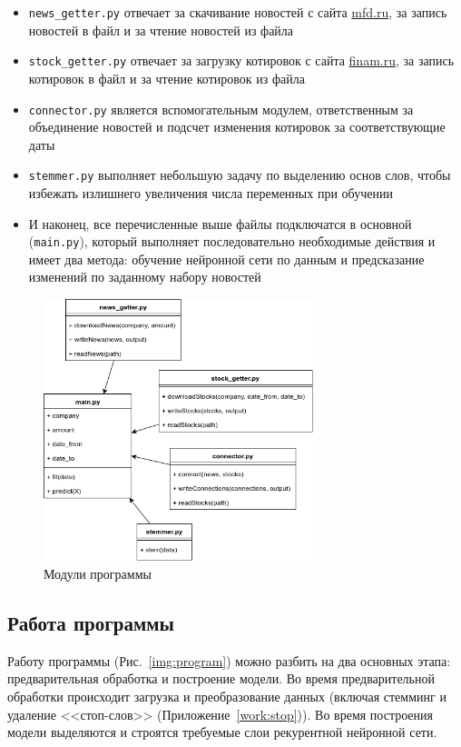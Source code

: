 \documentclass[14pt]{matmex-diploma-custom}
\begin{document}
\begin{itemize}
\item \texttt{news\_getter.py} отвечает за скачивание новостей с сайта \url{mfd.ru}, за запись новостей в файл и за чтение новостей из файла
\item \texttt{stock\_getter.py} отвечает за загрузку котировок с сайта \url{finam.ru}, за запись котировок в файл и за чтение котировок из файла
\item \texttt{connector.py} является вспомогательным модулем, ответственным за объединение новостей и подсчет изменения котировок за соответствующие даты
\item \texttt{stemmer.py} выполняет небольшую задачу по выделению основ слов, чтобы избежать излишнего увеличения числа переменных при обучении
\item И наконец, все перечисленные выше файлы подключатся в основной (\texttt{main.py}), который выполняет последовательно необходимые действия и имеет два метода: обучение нейронной сети по данным и предсказание изменений по заданному набору новостей
\end{itemize}

\begin{figure}[h]
\centering
\includegraphics[width=0.7\textwidth]{img/class}
\caption{Модули программы}
\label{img:class}
\end{figure}

\subsection{Работа программы}

Работу программы (Рис.~\ref{img:program}) можно разбить на два основных этапа: предварительная обработка и построение модели. Во время предварительной обработки происходит загрузка и преобразование данных (включая стемминг и удаление <<стоп-слов>> (Приложение~\ref{work:stop})). Во время построения модели выделяются и строятся требуемые слои рекурентной нейронной сети.
\end{document}
